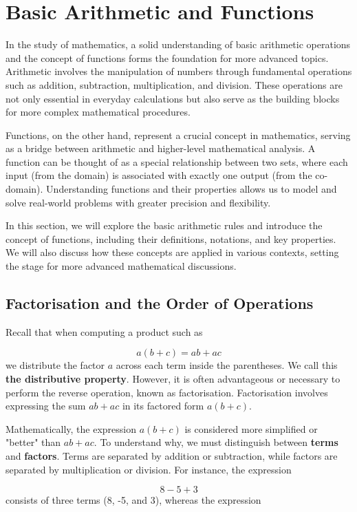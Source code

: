 \chapter{Basic Arithmetic and Functions}
\label{chap:ch1}
In the study of mathematics, a solid understanding of basic arithmetic operations and the concept of functions forms the foundation for more advanced topics. Arithmetic involves the manipulation of numbers through fundamental operations such as addition, subtraction, multiplication, and division. These operations are not only essential in everyday calculations but also serve as the building blocks for more complex mathematical procedures.

Functions, on the other hand, represent a crucial concept in mathematics, serving as a bridge between arithmetic and higher-level mathematical analysis. A function can be thought of as a special relationship between two sets, where each input (from the domain) is associated with exactly one output (from the co-domain). Understanding functions and their properties allows us to model and solve real-world problems with greater precision and flexibility.

In this section, we will explore the basic arithmetic rules and introduce the concept of functions, including their definitions, notations, and key properties. We will also discuss how these concepts are applied in various contexts, setting the stage for more advanced mathematical discussions.

\section{Factorisation and the Order of Operations}
Recall that when computing a product such as

\[
a(b + c) = ab + ac
\]
we distribute the factor \(a\) across each term inside the parentheses. We call this \textbf{the distributive property}. However, it is often advantageous or necessary to perform the reverse operation, known as factorisation. Factorisation involves expressing the sum \(ab + ac\) in its factored form \(a(b + c)\).

Mathematically, the expression \(a(b + c)\) is considered more simplified or "better" than \(ab + ac\). To understand why, we must distinguish between \textbf{terms} and \textbf{factors}. Terms are separated by addition or subtraction, while factors are separated by multiplication or division. For instance, the expression 

\[ 
8 - 5 + 3 
\]
consists of three terms (8, -5, and 3), whereas the expression 


